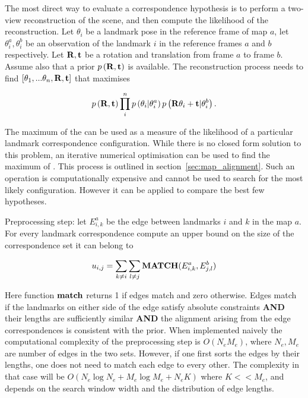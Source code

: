 The most direct way to evaluate a correspondence hypothesis is to
perform a two-view reconstruction of the scene, and then compute the
likelihood of the reconstruction. Let $\theta_i$ be a landmark
pose in the reference frame of map $a$, let $\theta_i^a, \theta_i^b$
be an observation of the landmark $i$ in the reference frames $a$ and
$b$ respectively. Let ${\bf R},{\bf t}$ be a rotation and translation
from frame $a$ to frame $b$. Assume also that a prior $p\left({\bf
R},{\bf t}\right)$ is available. The reconstruction process needs to
find $\left[\theta_1,...\theta_n, {\bf R},{\bf t}\right]$ that
maximises

\begin{equation}
p\left({\bf R},{\bf t}\right)
\prod_{i}^n p\left(\theta_i | \theta_i^a\right)
p\left({\bf R}\theta_i + {\bf t} | \theta_i^b\right).
\label{eqn:align}
\end{equation}

The maximum of the  can be used as a measure of
the likelihood of a particular landmark correspondence configuration.
While there is no closed form solution to this problem, an iterative
numerical optimisation can be used to find the maximum of
. This process is outlined in
section~\ref{sec:map_alignment}. Such an operation is computationally
expensive and cannot be used to search for the most likely
configuration. However it can be applied to compare the best few
hypotheses.




Preprocessing step: let $E^a_{i,k}$ be the edge between landmarks $i$
and $k$ in the map $a$. For every landmark correspondence compute an
upper bound on the size of the correspondence set it can belong to

$$
u_{i,j} = \sum_{k \ne i} \sum_{l \ne j} {\bf MATCH}(E^a_{i,k}, E^b_{j,l})
$$

Here function ${\bf match}$ returns 1 if edges match and zero
otherwise. Edges match if the landmarks on either side of the edge
satisfy absolute constraints {\bf AND} their lengths are sufficiently
similar {\bf AND} the alignment arising from the edge correspondences
is consistent with the prior. When implemented naively the
computational complexity of the preprocessing step is $O(N_eM_e)$,
where $N_e,M_e$ are number of edges in the two sets. However, if one
first sorts the edges by their lengths, one does not need to match
each edge to every other. The complexity in that case will be
$O(N_e\log N_e + M_e\log M_e + N_eK)$ where $K << M_e$, and depends on
the search window width and the distribution of edge lengths.

